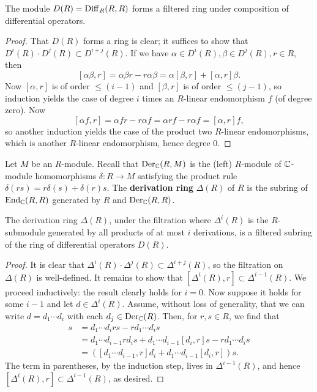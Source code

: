 \begin{lemma}
    The module $D(R)=\operatorname{Diff}_R(R,R)$ forms a filtered ring under composition of
    differential operators.
    \label{lemma:filtration}
\end{lemma}
\begin{proof}
    That $D(R)$ forms a ring is clear; it suffices to show that $D^i(R)\cdot D^j(R)\subset D^{i+j}(R)$.
    If we have $\alpha\in D^i(R),\beta\in D^j(R),r\in R$, then
    \[ [\alpha\beta,r] = \alpha\beta r-r\alpha\beta = \alpha[\beta,r] +[\alpha,r]\beta.  \]
    Now $[\alpha,r]$ is of order $\leqslant (i-1)$ and $[\beta,r]$ is of order $\leqslant(j-1)$, so induction
    yields the case of degree $i$ times an $R$-linear endomorphism $f$ (of degree zero). Now
    \[ [\alpha f, r]=\alpha fr-r\alpha f=\alpha rf-r\alpha f=[\alpha,r]f, \]
    so another induction yields the case of the product two $R$-linear endomorphisms, which is another
    $R$-linear endomorphism, hence degree $0$.
\end{proof}

\begin{definition}
    Let $M$ be an $R$-module. Recall that $\operatorname{Der}_{\mathbb{C}}(R,M)$ is the (left) $R$-module of $\mathbb{C}$-module homomorphisms
    $\delta:R\to M$ satisfying the product rule $\delta(rs)=r\delta(s)+\delta(r)s.$
    The \textbf{derivation ring} $\Delta(R)$ of $R$ is the subring of $\operatorname{End}_{\mathbb{C}}(R,R)$ generated
    by $R$ and $\operatorname{Der}_{\mathbb{C}}(R,R)$.
\end{definition}

\begin{lemma}
    The derivation ring $\Delta(R)$, under the filtration where $\Delta^i(R)$ is the
    $R$-submodule generated by all products of at most $i$ derivations, is a filtered
    subring of the ring of differential operators $D(R)$.
    \label{lemma:filtsubring}
\end{lemma}
\begin{proof}
    It is clear that $\Delta^i(R)\cdot\Delta^j(R)\subset\Delta^{i+j}(R)$, so the filtration on $\Delta(R)$ is well-defined. It remains to show
    that $[\Delta^i(R),r]\subset\Delta^{i-1}(R)$. We proceed inductively: the result clearly
    holds for $i=0$. Now suppose it holds for some $i-1$ and let $d\in\Delta^{i}(R)$. Assume,
    without loss of generality, that we can write $d=d_1\cdots d_i$ with each
    $d_j\in\operatorname{Der}_{\mathbb{C}}(R)$.
    Then, for $r,s\in R$, we find that
    \begin{align*}
        [d_1\cdots d_i,r]s &= d_1\cdots d_irs-rd_1\cdots d_is\\
        &= d_1\cdots d_{i-1}rd_is+d_1\cdots d_{i-1}[d_i,r]s-rd_1\cdots d_is\\
        &= \left([d_1\cdots d_{i-1},r]d_i+d_1\cdots d_{i-1}[d_i,r]\right)s.
    \end{align*}
    The term in parentheses, by the induction step, lives in $\Delta^{i-1}(R)$,
    and hence $[\Delta^i(R),r]\subset\Delta^{i-1}(R)$, as desired.
\end{proof}


